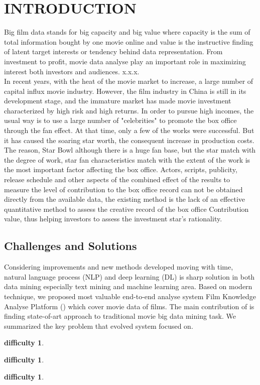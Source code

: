 \section{INTRODUCTION}
\par Big film data stands for big capacity and big value where capacity is the sum of total information bought by one movie online and value is the instructive finding of latent target interests or tendency behind data representation. From investment to profit, movie data analyse play an important role in maximizing interest both investors and audiences. x.x.x.\\
In recent years, with the heat of the movie market to increase, a large number of capital influx movie industry. However, the film industry in China is still in its development stage, and the immature market has made movie investment characterized by high risk and high returns. In order to pursue high incomes, the usual way is to use a large number of "celebrities" to promote the box office through the fan effect. At that time, only a few of the works were successful. But it has caused the soaring star worth, the consequent increase in production costs. The reason, Star Bowl although there is a huge fan base, but the star match with the degree of work, star fan characteristics match with the extent of the work is the most important factor affecting the box office. Actors, scripts, publicity, release schedule and other aspects of the combined effect of the results to measure the level of contribution to the box office record can not be obtained directly from the available data, the existing method is the lack of an effective quantitative method to assess the creative record of the box office Contribution value, thus helping investors to assess the investment star's rationality.\\
\subsection{Challenges and Solutions}
Considering improvements and new methods developed moving with time, natural language process (NLP) and deep learning (DL) is sharp solution in both data mining especially text mining and machine learning area. Based on modern technique, we proposed most valuable end-to-end analyse system Film Knowledge Analyse Platform (\system) which cover movie data of films. The main contribution of \system is finding state-of-art approach to traditional movie big data mining task. We summarized the key problem that evolved system \system focused on.
\newtheorem{difficulties}[theorem]{difficulty}
\begin{difficulties} \end{difficulties}
\begin{difficulties} \end{difficulties}
\begin{difficulties} \end{difficulties}


